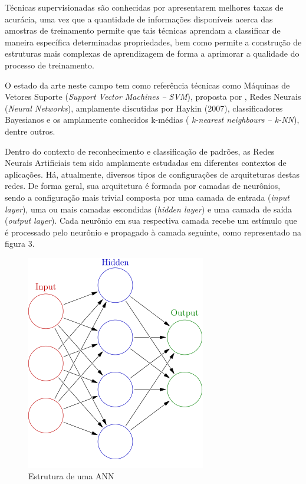 Técnicas supervisionadas são conhecidas por apresentarem melhores taxas de acurácia, uma vez que a quantidade de informações disponíveis acerca das amostras de treinamento permite que tais técnicas aprendam a classificar de maneira específica determinadas propriedades, bem como permite a construção de estruturas mais complexas de aprendizagem de forma a aprimorar a qualidade do processo de treinamento.

O estado da arte neste campo tem como referência técnicas como Máquinas de Vetores Suporte (\textit{Support Vector Machines – SVM}), proposta por , Redes Neurais (\textit{Neural Networks}), amplamente discutidas por Haykin (2007), classificadores Bayesianos e os amplamente conhecidos k-médias ( \textit{k-nearest neighbours – k-NN}), dentre outros\cite{Duda:00}. 

Dentro do contexto de reconhecimento e classificação de padrões, as Redes Neurais Artificiais tem sido amplamente estudadas em diferentes contextos de aplicações. Há, atualmente, diversos tipos de configurações de arquiteturas destas redes. De forma geral, sua arquitetura é formada por camadas de neurônios, sendo a configuração mais trivial composta por uma camada de entrada (\textit{input layer}), uma ou mais camadas escondidas (\textit{hidden layer}) e uma camada de saída (\textit{output layer}). Cada neurônio em sua respectiva camada recebe um estímulo que é processado pelo neurônio e propagado à camada seguinte, como representado na figura 3. 
\begin{figure}[ht!]
	\caption{Estrutura de uma ANN}
	\label{fig:ann-arq}
	\begin{center}
		\includegraphics[scale=0.48]{img/ann-arq.png}
	\end{center}
\end{figure}

